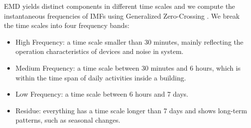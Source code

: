 EMD yields distinct components in different time scales and we compute the instantaneous frequencies \cite{IF} of IMFs using Generalized Zero-Crossing \cite{GZC}.  We break the time scales into four frequency bands:
\begin{itemize}
\item High Frequency: a time scale smaller than 30 minutes, mainly reflecting the operation characteristics of devices and noise in system. 
\item Medium Frequency: a time scale between 30 minutes and 6 hours, which is within the time span of daily activities inside a building.
\item Low Frequency: a time scale between 6 hours and 7 days. %
\item Residue: everything has a time scale longer than 7 days and shows long-term patterns, such as seasonal changes.
\end{itemize}





